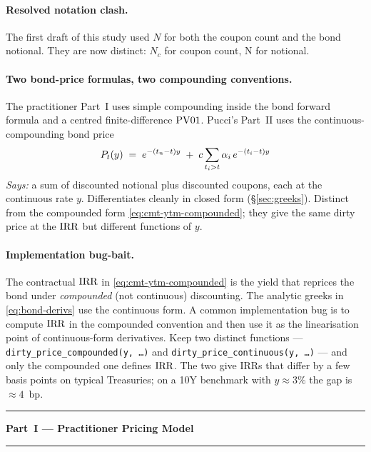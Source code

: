 \documentclass[11pt,a4paper]{article}
\newcommand{\Ncp}{N_{c}}        %
\begin{document}
\paragraph{Resolved notation clash.} The first draft of this study
used $N$ for both the coupon count and the bond notional. They are
now distinct: $\Ncp$ for coupon count, $\mathrm{N}$ for notional.

\paragraph{Two bond-price formulas, two compounding conventions.} The
practitioner Part~I uses simple compounding inside the bond forward
formula and a centred finite-difference $\mathrm{PV01}$. Pucci's Part~II
uses the continuous-compounding bond price
\begin{equation}\label{eq:bond-cont}
  P_{t}(y) \;=\; e^{-(t_n-t)y} \;+\; c \sum_{t_i > t} \alpha_i\, e^{-(t_i - t)y}
\end{equation}
\textit{Says:} a sum of discounted notional plus discounted coupons,
each at the continuous rate $y$. Differentiates cleanly in closed
form (\S\ref{sec:greeks}). Distinct from the compounded form
\eqref{eq:cmt-ytm-compounded}; they give the same dirty price at the
$\mathrm{IRR}$ but different functions of $y$.

\paragraph{Implementation bug-bait.} The contractual $\mathrm{IRR}$ in
\eqref{eq:cmt-ytm-compounded} is the yield that reprices the bond
under \emph{compounded} (not continuous) discounting. The analytic
greeks in \eqref{eq:bond-derivs} use the continuous form. A common
implementation bug is to compute $\mathrm{IRR}$ in the compounded convention
and then use it as the linearisation point of continuous-form
derivatives. Keep two distinct functions ---
\texttt{dirty\_price\_compounded(y, \dots)} and
\texttt{dirty\_price\_continuous(y, \dots)} --- and only the
compounded one defines $\mathrm{IRR}$. The two give IRRs that differ by a few
basis points on typical Treasuries; on a 10Y benchmark with $y \approx
3\%$ the gap is $\approx 4$~bp.

\bigskip\hrule\medskip
\begin{center}\Large\bfseries Part~I --- Practitioner Pricing Model\end{center}
\hrule\bigskip
\end{document}
